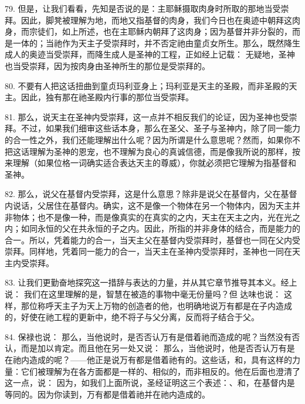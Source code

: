79. 但是，让我们看看，先知是否说的是：主耶稣摄取肉身时所取的那地当受崇拜。因此，脚凳被理解为地，而地又指基督的肉身，我们今日也在奥迹中朝拜这肉身，而宗徒们，如上所述，也在主耶稣内朝拜了这肉身；因为基督并非分裂的，而是一体的；当祂作为天主子受崇拜时，并不否定祂由童贞女所生。那么，既然降生成人的奥迹当受崇拜，而降生成人是圣神的工程，正如经上记载：  无疑地，圣神也当受崇拜，因为按肉身由圣神所生的那位是受崇拜的。\par

80. 不要有人把这话扭曲到童贞玛利亚身上；玛利亚是天主的圣殿，而非圣殿的天主。因此，独有那在祂圣殿内行事的那位当受崇拜。\par

81. 那么，说天主在圣神内受崇拜，这一点并不相反我们的论证，因为圣神也受崇拜。不过，如果我们细审这些话本身，那么在圣父、圣子与圣神内，除了同一能力的合一性之外，我们还能理解出什么呢？因为所谓是什么意思呢？然而，如果你不把这话理解为圣神的恩宠，也不理解为良心的真诚信德，而是像我所说的那样，按来理解（如果位格一词确实适合表达天主的尊威），你就必须把它理解为指基督和圣神。\par

82. 那么，说父在基督内受崇拜，这是什么意思？除非是说父在基督内，父在基督内说话，父居住在基督内。确实，这不是像一个物体在另一个物体内，因为天主并非物体；也不是像一种，而是像真实的在真实的之内，天主在天主之内，光在光之内；如同永恒的父在共永恒的子之内。因此，所指的并非身体的结合，而是能力的合一。所以，凭着能力的合一，当天主父在基督内受崇拜时，基督也一同在父内受崇拜。同样地，凭着同一能力的合一，当天主在圣神内受崇拜时，圣神也一同在天主内受崇拜。\par

83. 让我们更勤奋地探究这一措辞与表达的力量，并从其它章节推导其本义。经上说： 我们在这里理解的是，智慧在被造的事物中毫无份量吗？但  达味也说： 这样，那位称呼天主子为天上万物的创造者的他，也明确地说万有都是在子内造成的，好使在祂工程的更新中，绝不将子与父分离，反而将子结合于父。\par

84. 保禄也说：  那么，当他说时，是否否认万有是借着祂而造成的呢？当然没有否认，而是加以肯定。而且他在另一处又说：  那么，当他说时，他是否否认万有是在祂内造成的呢？——他正是说万有都是借着祂有的。这些话，和，具有这样的力量：它们被理解为在各方面都是一样的、相似的，而非相反的。他在后面也澄清了这一点，说：  因为，如我们上面所说，圣经证明这三个表述：、和，在基督内是等同的。因为你读到，万有都是借着祂并在祂内造成的。\par

